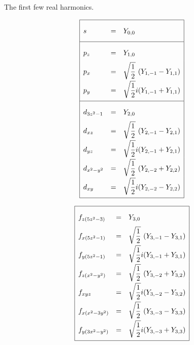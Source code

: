 \begin{table}[h!]
\caption{The first few real harmonics.}
\label{table:realHarm}
\vspace{1em}
\hspace{4em}
\begin{minipage}{0.4\textwidth}
\begin{equation*}
\renewcommand\arraystretch{2.2}
\begin{array}{|>{\displaystyle}l >{\displaystyle}c >{\displaystyle}l|}
  \hline
  s               & = & Y_{0,0}                       \\[0.4em] \hline
  p_z             & = & Y_{1,0}                       \\
  p_x             & = & \sqrt{\frac{1}{2}}\phantom{i}(Y_{1,-1}-Y_{1,1})  \\
  p_y             & = & \sqrt{\frac{1}{2}}i(Y_{1,-1}+Y_{1,1}) \\[0.4em] \hline
  d_{3z^2-1}      & = & Y_{2,0}                       \\
  d_{xz}          & = & \sqrt{\frac{1}{2}}\phantom{i}(Y_{2,-1}-Y_{2,1})  \\
  d_{yz}          & = & \sqrt{\frac{1}{2}}i(Y_{2,-1}+Y_{2,1}) \\
  d_{x^2-y^2}     & = & \sqrt{\frac{1}{2}}\phantom{i}(Y_{2,-2}+Y_{2,2})  \\
  d_{xy}          & = & \sqrt{\frac{1}{2}}i(Y_{2,-2}-Y_{2,2}) \\[0.4em]
  \hline
\end{array}
\end{equation*}
\end{minipage}
\begin{minipage}{0.4\textwidth}
\begin{equation*}
\renewcommand\arraystretch{2.2}
\begin{array}{|>{\displaystyle}l >{\displaystyle}c >{\displaystyle}l|}
  \hline
  f_{z(5z^2-3)}   & = & Y_{3,0}                       \\
  f_{x(5z^2-1)}   & = & \sqrt{\frac{1}{2}}\phantom{i}(Y_{3,-1}-Y_{3,1})  \\
  f_{y(5z^2-1)}   & = & \sqrt{\frac{1}{2}}i(Y_{3,-1}+Y_{3,1}) \\
  f_{z(x^2-y^2)}  & = & \sqrt{\frac{1}{2}}\phantom{i}(Y_{3,-2}+Y_{3,2})  \\
  f_{xyz}         & = & \sqrt{\frac{1}{2}}i(Y_{3,-2}-Y_{3,2}) \\
  f_{x(x^2-3y^2)} & = & \sqrt{\frac{1}{2}}\phantom{i}(Y_{3,-3}-Y_{3,3})  \\
  f_{y(3x^2-y^2)} & = & \sqrt{\frac{1}{2}}i(Y_{3,-3}+Y_{3,3}) \\[0.4em]
  \hline
\end{array}
\end{equation*}
\end{minipage}
\end{table}

